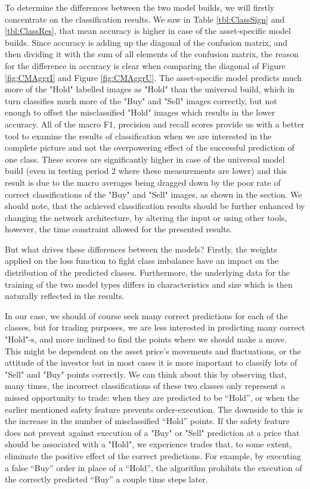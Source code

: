 \documentclass[11pt, a4paper]{article}
\begin{document}
To determine the differences between the two model builds, we will firstly concentrate on the classification results. We saw in Table \ref{tbl:ClassSign} and \ref{tbl:ClassRes}, that mean accuracy is higher in case of the asset-specific model builds. Since accuracy is adding up the diagonal of the confusion matrix, and then dividing it with the sum of all elements of the confusion matrix, the reason for the difference in accuracy is clear when comparing the diagonal of Figure \ref{fig:CMAggrI} and Figure \ref{fig:CMAggrU}. The asset-specific model predicts much more of the "Hold" labelled images as "Hold" than the universal build, which in turn classifies much more of the "Buy" and "Sell" images correctly, but not enough to offset the misclassified "Hold" images which results in the lower accuracy. All of the macro F1, precision and recall scores provide us with a better tool to examine the results of classification when we are interested in the complete picture and not the overpowering effect of the successful prediction of one class. These scores are significantly higher in case of the universal model build (even in testing period 2 where these measurements are lower) and this result is due to the macro averages being dragged down by the poor rate of correct classifications of the "Buy" and "Sell" images, as shown in the  section. We should note, that the achieved classification results should be further enhanced by changing the network architecture, by altering the input or using other tools, however, the time constraint allowed for the presented results.

But what drives these differences between the models? Firstly, the weights applied on the loss function to fight class imbalance have an impact on the distribution of the predicted classes. Furthermore, the underlying data for the training of the two model types differs in characteristics and size which is then naturally reflected in the results. 

In our case, we should of course seek many correct predictions for each of the classes, but for trading purposes, we are less interested in predicting many correct "Hold"-s, and more inclined to find the points where we should make a move. This might be dependent on the asset price's movements and fluctuations, or the attitude of the investor but in most cases it is more important to classify lots of "Sell" and "Buy" points correctly. 
We can think about this by observing that, many times, the incorrect classifications of these two classes only represent a missed opportunity to trade: when they are predicted to be “Hold”, or when the earlier mentioned safety feature prevents order-execution. The downside to this is the increase in the number of misclassified “Hold” points. If the safety feature does not prevent against execution of a "Buy" or "Sell" prediction at a price that should be associated with a "Hold", we experience trades that, to some extent, eliminate the positive effect of the correct predictions. For example, by executing a false “Buy” order in place of a “Hold”, the algorithm prohibits the execution of the correctly predicted “Buy” a couple time steps later. 
\end{document}
